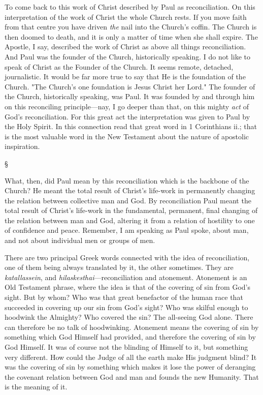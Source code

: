 \documentclass[12pt,letterpaper,oneside]{book}
\begin{document}
To come back to this work of Christ described 
by Paul as reconciliation. On this 
interpretation of the work of Christ the whole 
Church rests. If you move faith from that 
centre you have driven \textit{the} nail into the Church's 
coffin. The Church is then doomed to death, 
and it is only a matter of time when she 
shall expire. The Apostle, I say, described the 
work of Christ as above all things reconciliation. 
And Paul was the founder of the Church, 
historically speaking. I do not like to speak 
of Christ as the Founder of the Church. It 
seems remote, detached, journalistic. It would 
be far more true to say that He is the foundation 
of the Church. "The Church's one foundation 
is Jesus Christ her Lord." The founder 
of the Church, historically speaking, was Paul. 
It was founded by and through him on this 
reconciling principle---nay, I go deeper than 
that, on this mighty \textit{act} of God's reconciliation. 
For this great act the interpretation was 
given to Paul by the Holy Spirit. In this connection 
read that great word in 1 Corinthians ii.; 
that is the most valuable word in the New 
Testament about the nature of apostolic inspiration. 

\begin{center}
\S
\end{center}

What, then, did Paul mean by this reconciliation 
which is the backbone of the Church? 
He meant the total result of Christ's life-work 
in permanently changing the relation between 
collective man and God. By reconciliation Paul 
meant the total result of Christ's life-work in 
the fundamental, permanent, final changing of 
the relation between man and God, altering 
it from a relation of hostility to one of confidence 
and peace. Remember, I am speaking 
as Paul spoke, about man, and not about 
individual men or groups of men. 

There are two principal Greek words connected 
with the idea of reconciliation, one of 
them being always translated by it, the other 
sometimes. They are \textit{katallassein}, and \textit{hilaskesthai}---reconciliation 
and atonement. Atonement 
is an Old Testament phrase, where the 
idea is that of the covering of sin from God's 
sight. But by whom? Who was that great 
benefactor of the human race that succeeded in 
covering up our sin from God's sight? Who 
was skilful enough to hoodwink the Almighty? 
Who covered the sin? The all-seeing God 
alone. There can therefore be no talk of hoodwinking. Atonement means the covering of 
sin by something which God Himself had 
provided, and therefore the covering of sin by
God Himself. It was of course not the blinding 
of Himself to it, but something very different. 
How could the Judge of all the earth make 
His judgment blind? It was the covering of 
sin by something which makes it lose the power 
of deranging the covenant relation between 
God and man and founds the new Humanity. 
That is the meaning of it. 
\end{document}
